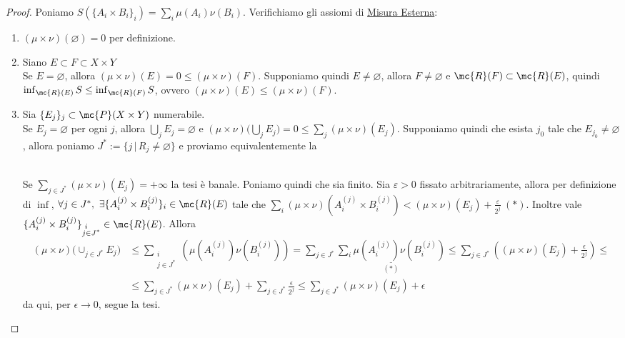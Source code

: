 \begin{proof}
    Poniamo $S(\{A_i\times B_i\}_i)=\sum_{i}\mu(A_i)\nu(B_i)$. Verifichiamo gli assiomi di \hyperref[def: misura esterna]{Misura Esterna}:
    \begin{enumerate}[label=$\roman*)$]
        \item $(\mu\times\nu)(\varnothing)=0$ per definizione.
        \item Siano $E\subset F\subset  X\times Y$ \\
        Se $E=\varnothing$, allora $(\mu\times\nu)(E)=0\leq (\mu\times\nu)(F)$. Supponiamo quindi $E\neq \varnothing$, allora $F\neq \varnothing$ e $\mc{R}(F)\subset \mc{R}(E)$, quindi $\inf_{\mc{R}(E)}S\leq \inf_{\mc{R}(F)}S$, ovvero  $(\mu\times\nu)(E)\leq (\mu\times\nu)(F)$.
        \item Sia $\{E_j\}_j\subset \mc{P}(X\times Y)$ numerabile. \\
        Se $E_j=\varnothing$ per ogni $j$, allora $\bigcup_jE_j=\varnothing$ e $(\mu\times\nu)\bigg(\bigcup_jE_j\bigg)=0\leq \sum_j(\mu\times\nu)(E_j)$. Supponiamo quindi che esista $j_0$ tale che $E_{j_0}\neq \varnothing$, allora poniamo $J^*:=\{j\,|\,R_j\neq \varnothing\}$ e proviamo equivalentemente la 
        
        ~\\
        Se $\sum_{j\in J^*}(\mu\times\nu)(E_j)=+\infty$ la tesi è banale. Poniamo quindi che sia finito. Sia $\varepsilon>0$ fissato arbitrariamente, allora per definizione di $\inf$, $\forall j\in J^*,\ \exists \{A_i^{(j)}\times B_i^{(j)}\}_{i}\in \mc{R}(E)$ tale che $\sum_i(\mu\times \nu)(A_i^{(j)}\times B_i^{(j)})< (\mu\times\nu)(E_j)+\frac{\varepsilon}{2^j}\ (*)$. Inoltre vale $\{A_i^{(j)}\times B_i^{(j)}\}_{\substack{i\quad\\j\in J^*}}\in \mc{R}(E)$. Allora
        \[\begin{aligned}(\mu\times \nu)\biggl(\cup_{j\in J^*}E_j\biggr) & \leq \sum_{\substack{i\\j\in J^*}}\left(\mu\left(A_i^{(j)}\right) \nu\left(B_i^{(j)}\right)\right) = \sum_{j\in J^*}\underset{(*)}{\underline{\sum_i\mu(A_i^{(j)})\nu(B_i^{(j)})}}\leq \sum_{j\in J^*}\left((\mu\times \nu)(E_j)+\frac{\epsilon}{2^j}\right)\leq\\ &\leq \sum_{j\in J^*}(\mu\times \nu)(E_j)+\sum_{j\in J^*}\frac{\epsilon}{2^j} \leq \sum_{j\in J^*}(\mu\times \nu)(E_j)+\epsilon\end{aligned}\]
        da qui, per $\epsilon\to 0$, segue la tesi.\qedhere
    \end{enumerate}
\end{proof}

